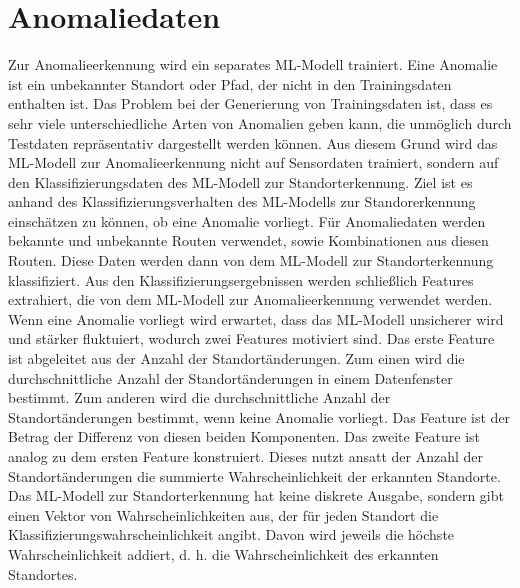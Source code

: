\section{Anomaliedaten}
\label{sec:data_anomalie}
Zur Anomalieerkennung wird ein separates ML-Modell trainiert.
Eine Anomalie ist ein unbekannter Standort oder Pfad, der nicht in den Trainingsdaten enthalten ist.
Das Problem bei der Generierung von Trainingsdaten ist, dass es sehr viele unterschiedliche Arten von Anomalien geben kann,
die unmöglich durch Testdaten repräsentativ dargestellt werden können.
Aus diesem Grund wird das ML-Modell zur Anomalieerkennung nicht auf Sensordaten trainiert, sondern auf den
Klassifizierungsdaten des ML-Modell zur Standorterkennung.
Ziel ist es anhand des Klassifizierungsverhalten des ML-Modells zur Standorerkennung einschätzen zu können, ob eine Anomalie vorliegt.
\newline
\newline
Für Anomaliedaten werden bekannte und unbekannte Routen verwendet, sowie Kombinationen aus diesen Routen.
Diese Daten werden dann von dem ML-Modell zur Standorterkennung klassifiziert.
Aus den Klassifizierungsergebnissen werden schließlich Features extrahiert, die von dem ML-Modell zur Anomalieerkennung verwendet werden.
\newline
\newline
Wenn eine Anomalie vorliegt wird erwartet, dass das ML-Modell unsicherer wird und stärker fluktuiert,
wodurch zwei Features motiviert sind.
Das erste Feature ist abgeleitet aus der Anzahl der Standortänderungen.
Zum einen wird die durchschnittliche Anzahl der Standortänderungen in einem Datenfenster bestimmt.
Zum anderen wird die durchschnittliche Anzahl der Standortänderungen bestimmt, wenn keine Anomalie vorliegt.
Das Feature ist der Betrag der Differenz von diesen beiden Komponenten.
\newline
\newline
Das zweite Feature ist analog zu dem ersten Feature konstruiert.
Dieses nutzt ansatt der Anzahl der Standortänderungen die summierte Wahrscheinlichkeit der erkannten Standorte.
Das ML-Modell zur Standorterkennung hat keine diskrete Ausgabe, sondern gibt einen Vektor von Wahrscheinlichkeiten aus,
der für jeden Standort die Klassifizierungswahrscheinlichkeit angibt.
Davon wird jeweils die höchste Wahrscheinlichkeit addiert, d. h. die Wahrscheinlichkeit des erkannten Standortes.